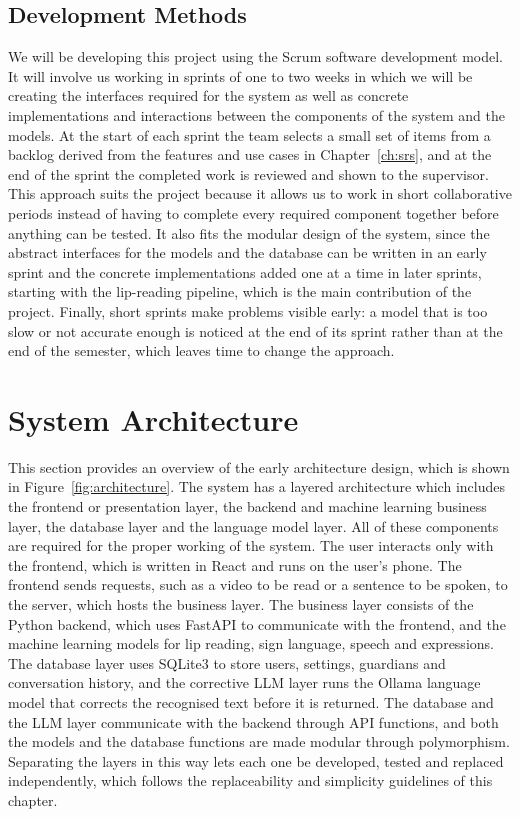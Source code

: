 \documentclass{FastFyp}
\begin{document}
\subsection{Development Methods}
\label{sec:devmethods}
We will be developing this project using the Scrum software development model. It will involve us working in sprints of one to two weeks in which we will be creating the interfaces required for the system as well as concrete implementations and interactions between the components of the system and the models. At the start of each sprint the team selects a small set of items from a backlog derived from the features and use cases in Chapter~\ref{ch:srs}, and at the end of the sprint the completed work is reviewed and shown to the supervisor. This approach suits the project because it allows us to work in short collaborative periods instead of having to complete every required component together before anything can be tested. It also fits the modular design of the system, since the abstract interfaces for the models and the database can be written in an early sprint and the concrete implementations added one at a time in later sprints, starting with the lip-reading pipeline, which is the main contribution of the project. Finally, short sprints make problems visible early: a model that is too slow or not accurate enough is noticed at the end of its sprint rather than at the end of the semester, which leaves time to change the approach.

\section{System Architecture}
This section provides an overview of the early architecture design, which is shown in Figure~\ref{fig:architecture}. The system has a layered architecture which includes the frontend or presentation layer, the backend and machine learning business layer, the database layer and the language model layer. All of these components are required for the proper working of the system. The user interacts only with the frontend, which is written in React and runs on the user's phone. The frontend sends requests, such as a video to be read or a sentence to be spoken, to the server, which hosts the business layer. The business layer consists of the Python backend, which uses FastAPI to communicate with the frontend, and the machine learning models for lip reading, sign language, speech and expressions. The database layer uses SQLite3 to store users, settings, guardians and conversation history, and the corrective LLM layer runs the Ollama language model that corrects the recognised text before it is returned. The database and the LLM layer communicate with the backend through API functions, and both the models and the database functions are made modular through polymorphism. Separating the layers in this way lets each one be developed, tested and replaced independently, which follows the replaceability and simplicity guidelines of this chapter.
\end{document}
